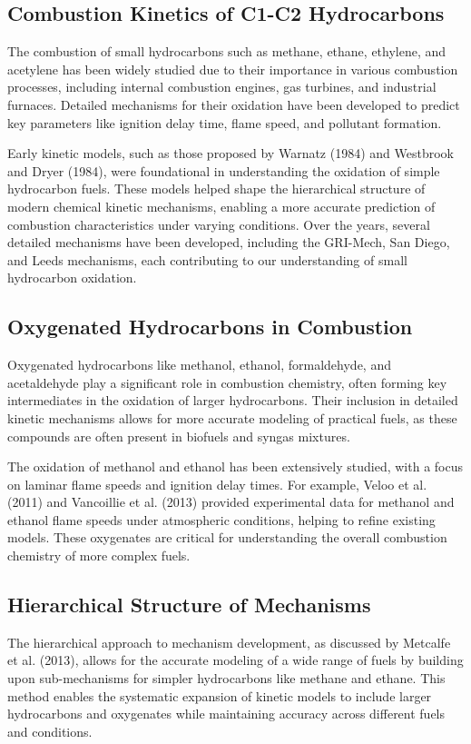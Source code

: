 \documentclass[12pt]{report}
\begin{document}
\subsection{Combustion Kinetics of C1-C2 Hydrocarbons}
The combustion of small hydrocarbons such as methane, ethane, ethylene, and acetylene has been widely studied due to their importance in various combustion processes, including internal combustion engines, gas turbines, and industrial furnaces. Detailed mechanisms for their oxidation have been developed to predict key parameters like ignition delay time, flame speed, and pollutant formation.

Early kinetic models, such as those proposed by Warnatz (1984) and Westbrook and Dryer (1984), were foundational in understanding the oxidation of simple hydrocarbon fuels. These models helped shape the hierarchical structure of modern chemical kinetic mechanisms, enabling a more accurate prediction of combustion characteristics under varying conditions. Over the years, several detailed mechanisms have been developed, including the GRI-Mech, San Diego, and Leeds mechanisms, each contributing to our understanding of small hydrocarbon oxidation.

\subsection{Oxygenated Hydrocarbons in Combustion}
Oxygenated hydrocarbons like methanol, ethanol, formaldehyde, and acetaldehyde play a significant role in combustion chemistry, often forming key intermediates in the oxidation of larger hydrocarbons. Their inclusion in detailed kinetic mechanisms allows for more accurate modeling of practical fuels, as these compounds are often present in biofuels and syngas mixtures.

The oxidation of methanol and ethanol has been extensively studied, with a focus on laminar flame speeds and ignition delay times. For example, Veloo et al. (2011) and Vancoillie et al. (2013) provided experimental data for methanol and ethanol flame speeds under atmospheric conditions, helping to refine existing models. These oxygenates are critical for understanding the overall combustion chemistry of more complex fuels.

\subsection{Hierarchical Structure of Mechanisms}
The hierarchical approach to mechanism development, as discussed by Metcalfe et al. (2013), allows for the accurate modeling of a wide range of fuels by building upon sub-mechanisms for simpler hydrocarbons like methane and ethane. This method enables the systematic expansion of kinetic models to include larger hydrocarbons and oxygenates while maintaining accuracy across different fuels and conditions.
\end{document}
